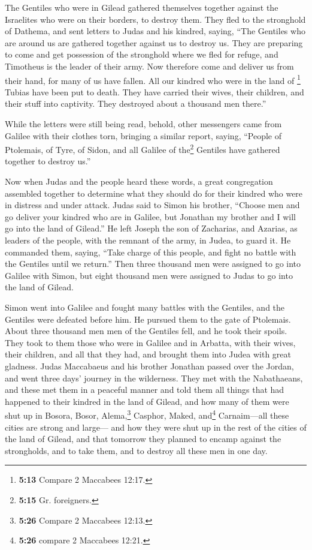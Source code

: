  The Gentiles who were in Gilead gathered themselves
together against the Israelites who were on their borders, to destroy
them. They fled to the stronghold of Dathema,  and sent
letters to Judas and his kindred, saying, ``The Gentiles who are around
us are gathered together against us to destroy us.  They
are preparing to come and get possession of the stronghold where we fled
for refuge, and Timotheus is the leader of their army. 
Now therefore come and deliver us from their hand, for many of us have
fallen.  All our kindred who were in the land of
\footnote{\textbf{5:13} Compare 2 Maccabees 12:17.} Tubias have been put
to death. They have carried their wives, their children, and their stuff
into captivity. They destroyed about a thousand men there.''

 While the letters were still being read, behold, other
messengers came from Galilee with their clothes torn, bringing a similar
report,  saying, ``People of Ptolemais, of Tyre, of
Sidon, and all Galilee of the\footnote{\textbf{5:15} Gr. foreigners.}
Gentiles have gathered together to destroy us.''

 Now when Judas and the people heard these words, a great
congregation assembled together to determine what they should do for
their kindred who were in distress and under attack. 
Judas said to Simon his brother, ``Choose men and go deliver your
kindred who are in Galilee, but Jonathan my brother and I will go into
the land of Gilead.''  He left Joseph the son of
Zacharias, and Azarias, as leaders of the people, with the remnant of
the army, in Judea, to guard it.  He commanded them,
saying, ``Take charge of this people, and fight no battle with the
Gentiles until we return.''  Then three thousand men were
assigned to go into Galilee with Simon, but eight thousand men were
assigned to Judas to go into the land of Gilead.

 Simon went into Galilee and fought many battles with the
Gentiles, and the Gentiles were defeated before him.  He
pursued them to the gate of Ptolemais. About three thousand men men of
the Gentiles fell, and he took their spoils.  They took
to them those who were in Galilee and in Arbatta, with their wives,
their children, and all that they had, and brought them into Judea with
great gladness.  Judas Maccabaeus and his brother
Jonathan passed over the Jordan, and went three days' journey in the
wilderness.  They met with the Nabathaeans, and these met
them in a peaceful manner and told them all things that had happened to
their kindred in the land of Gilead,  and how many of
them were shut up in Bosora, Bosor, Alema,\footnote{\textbf{5:26}
  Compare 2 Maccabees 12:13.} Casphor, Maked, and\footnote{\textbf{5:26}
  compare 2 Maccabees 12:21.} Carnaim---all these cities are strong and
large---  and how they were shut up in the rest of the
cities of the land of Gilead, and that tomorrow they planned to encamp
against the strongholds, and to take them, and to destroy all these men
in one day.

